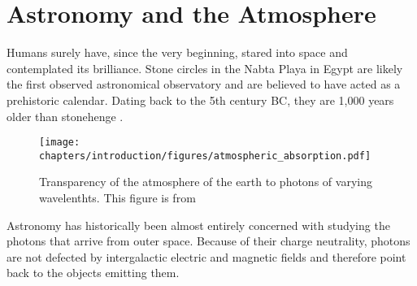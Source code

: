 \section{Astronomy and the Atmosphere}

Humans surely have, since the very beginning,
 stared into space and contemplated its brilliance.
Stone circles in the Nabta Playa in Egypt are likely the first observed
astronomical observatory and are believed to have acted as a prehistoric
calendar.  Dating back to the 5th century BC, they are 1,000 years older
than stonehenge \citep{mck-mahille_2007_astronomy-nabta}.  

\begin{figure}[htbp]
  \centering
  \texttt{[image: chapters/introduction/figures/atmospheric\_absorption.pdf]}
  \caption{
  Transparency of the atmosphere of the earth to photons of 
  varying wavelenthts.  This figure is from \cite{carroll_2006_introduction-modern}
  }
\end{figure}








Astronomy has historically been almost entirely concerned with studying
the photons that arrive from outer space.  Because of their charge
neutrality, photons are not defected by intergalactic electric and
magnetic fields and therefore point back to the objects 
emitting them. 

